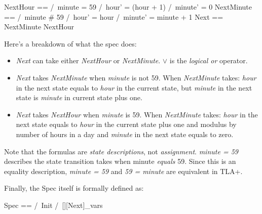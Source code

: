 \begin{tla}
    NextHour ==
        /\ minute = 59 
        /\ hour' = (hour + 1) %
        /\ minute' = 0
    NextMinute == 
        /\ minute # 59
        /\ hour' = hour 
        /\ minute' = minute + 1 
    Next ==
        \/ NextMinute
        \/ NextHour
\end{tla}
\begin{tlatex}
%
%
%
%
%
%
%
%
%
%
%
\end{tlatex}
 \newline


Here's a breakdown of what the spec does:
\begin{itemize}
    \item \textit{Next} can take either \textit{NextHour} or \textit{NextMinute}.
    $\lor$ is the \textit{logical or} operator.
    \item \textit{Next} takes \textit{NextMinute} when \textit{minute} is not
    59. When \textit{NextMinute} takes: \textit{hour} in the next state equals
    to \textit{hour} in the current state, but \textit{minute} in the next state 
    is \textit{minute} in current state plus one.
    \item \textit{Next} takes \textit{NextHour} when \textit{minute} is 59.
    When \textit{NextMinute} takes: \textit{hour} in the next state equals to
    \textit{hour} in the current state plus one and modulus by number of hours in
    a day and \textit{minute} in the next state equals to zero. 
\end{itemize}

Note that the formulas are \textit{state descriptions}, not \textit{assignment}.
\textit{minute = 59} describes the state transition takes when minute
\textit{equals} 59. Since this is an equality description, \textit{minute = 59}
and \textit{59 = minute} are equivalent in TLA+.\newline

Finally, the Spec itself is formally defined as:\newline
\begin{tla}
    Spec ==
        /\ Init
        /\ [][Next]_vars
\end{tla}
\begin{tlatex}
%
%
%
%
\end{tlatex}
\newline

